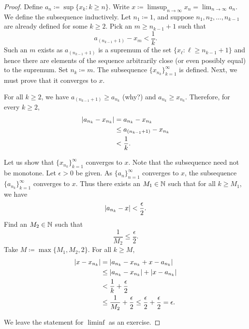 \begin{proof}
Define $a_n \coloneqq \sup \{ x_k : k \geq n \}$.
Write
$x \coloneqq \limsup_{n\to\infty} x_n = \lim_{n\to\infty} a_n$.
We define the subsequence inductively.
Let $n_1 \coloneqq 1$, and suppose $n_1,n_2,\ldots,n_{k-1}$ are already defined for
some $k \geq 2$.  Pick an $m \geq n_{k-1} + 1$
such that
\begin{equation*}
a_{(n_{k-1}+1)} - x_m < \frac{1}{k} .
\end{equation*}
Such an $m$ exists
as $a_{(n_{k-1}+1)}$ is a supremum of the
set $\{ x_\ell : \ell \geq n_{k-1} + 1 \}$ and hence there are elements
of the sequence arbitrarily close (or even possibly equal) to the supremum.
Set $n_{k} \coloneqq  m$.  The subsequence $\{ x_{n_k} \}_{k=1}^\infty$ is defined.  Next, we
must prove that it converges to $x$.

For all $k \geq 2$, we have
$a_{(n_{k-1}+1)} \geq a_{n_k}$ (why?) and $a_{n_{k}} \geq x_{n_k}$.
Therefore, for every $k \geq 2$,
\begin{equation*}
\begin{split}
\left\lvert {a_{n_k} - x_{n_k}} \right\rvert & = 
a_{n_k} - x_{n_k}
\\
& \leq
a_{(n_{k-1}+1)} - x_{n_k}
\\
& < \frac{1}{k} .
\end{split}
\end{equation*}

Let us show that $\{ x_{n_k} \}_{k=1}^\infty$ converges to $x$.
Note that the subsequence need not be monotone.  Let $\epsilon > 0$ be given.
As $\{ a_n \}_{n=1}^\infty$ converges to $x$, the subsequence
$\{ a_{n_k} \}_{k=1}^\infty$ converges to $x$.
Thus there exists an $M_1 \in {\mathbb{N}}$
such that for all $k \geq M_1$, we have
\begin{equation*}
\left\lvert {a_{n_k} - x} \right\rvert < \frac{\epsilon}{2} .
\end{equation*}
Find an $M_2 \in {\mathbb{N}}$ such that
\begin{equation*}
\frac{1}{M_2} \leq \frac{\epsilon}{2}.
\end{equation*}
Take $M \coloneqq \max \{M_1 , M_2 , 2 \}$.  For all $k \geq M$,
\begin{equation*}
\begin{split}
\left\lvert {x- x_{n_k}} \right\rvert & =
\left\lvert {a_{n_k} - x_{n_k} + x - a_{n_k}} \right\rvert
\\
& \leq \left\lvert {a_{n_k} - x_{n_k}} \right\rvert + \left\lvert {x - a_{n_k}} \right\rvert
\\
& < \frac{1}{k} + \frac{\epsilon}{2}
\\
& \leq \frac{1}{M_2} + \frac{\epsilon}{2} \leq \frac{\epsilon}{2} +
\frac{\epsilon}{2} = \epsilon .
\end{split}
\end{equation*}

We leave the statement for $\liminf$ as an exercise.
\end{proof}

